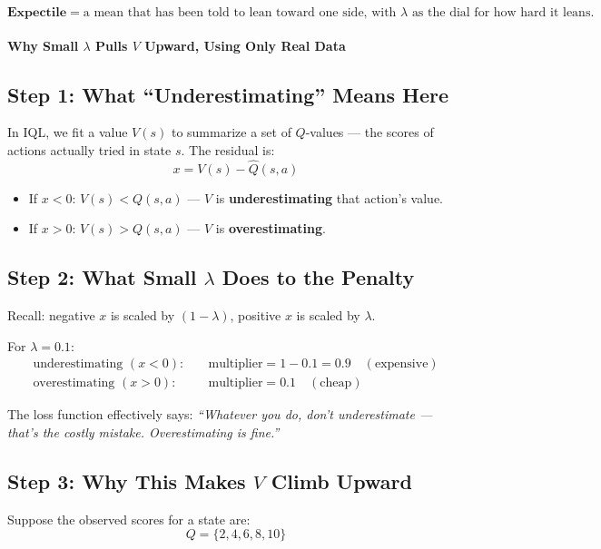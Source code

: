 \documentclass[11pt]{article}
\begin{document}
\[
\textbf{Expectile} = \text{a mean that has been told to lean toward one side, with } \lambda \text{ as the dial for how hard it leans.}
\]

\paragraph{Why Small $\lambda$ Pulls $V$ Upward, Using Only Real Data}

\subsection{Step 1: What ``Underestimating'' Means Here}

In IQL, we fit a value $V(s)$ to summarize a set of $Q$-values — the scores of actions actually tried in state $s$. The residual is:
\[
x = V(s) - \hat{Q}(s,a)
\]

\begin{itemize}
    \item If $x < 0$: $V(s) < Q(s,a)$ — $V$ is \textbf{underestimating} that action's value.
    \item If $x > 0$: $V(s) > Q(s,a)$ — $V$ is \textbf{overestimating}.
\end{itemize}

\subsection{Step 2: What Small $\lambda$ Does to the Penalty}

Recall: negative $x$ is scaled by $(1-\lambda)$, positive $x$ is scaled by $\lambda$.

For $\lambda = 0.1$:
\begin{align*}
\text{underestimating } (x<0): &\quad \text{multiplier} = 1 - 0.1 = 0.9 \quad (\text{expensive}) \\
\text{overestimating } (x>0): &\quad \text{multiplier} = 0.1 \quad (\text{cheap})
\end{align*}

The loss function effectively says: \emph{``Whatever you do, don't underestimate — that's the costly mistake. Overestimating is fine.''}

\subsection{Step 3: Why This Makes $V$ Climb Upward}

Suppose the observed scores for a state are:
\[
Q = \{2, 4, 6, 8, 10\}
\]
\end{document}

